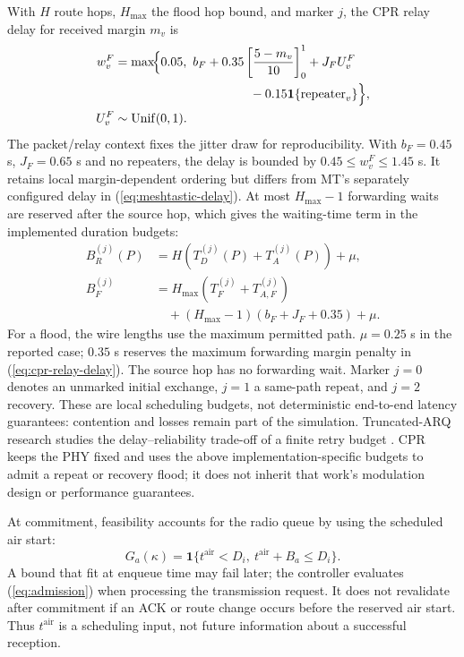 \documentclass[conference,letterpaper,10pt]{IEEEtran}
\begin{document}
With $H$ route hops, $H_{\max}$ the flood hop bound, and marker $j$, the
CPR relay delay for received margin $m_v$ is
\begin{equation}
\begin{aligned}
w_v^{F}&=\max\!\Bigl\{0.05,\ b_F+
  0.35\left[\frac{5-m_v}{10}\right]_0^1+J_F U_v^F\\
 &\hspace{38mm}-0.15\mathbf 1\{\mathrm{repeater}_v\}\Bigr\},\\
U_v^F&\sim\mathrm{Unif}(0,1).
\end{aligned}
\label{eq:cpr-relay-delay}
\end{equation}
The packet/relay context fixes the jitter draw for reproducibility.
With $b_F=0.45$ s, $J_F=0.65$ s and no repeaters, the delay is bounded by
$0.45\leq w_v^F\leq1.45$ s. It retains local margin-dependent ordering
but differs from MT's separately configured delay in
(\ref{eq:meshtastic-delay}). At most $H_{\max}-1$ forwarding waits are
reserved after the source hop, which gives the waiting-time term in the
implemented duration budgets:
\begin{equation}
\begin{aligned}
B_R^{(j)}(P)&=H\left(T_D^{(j)}(P)+T_A^{(j)}(P)\right)+\mu,\\
B_F^{(j)}&=H_{\max}\left(T_F^{(j)}+T_{A,F}^{(j)}\right)\\
 &\quad +(H_{\max}-1)(b_F+J_F+0.35)+\mu.
\end{aligned}
\label{eq:cpr-bounds}
\end{equation}
For a flood, the wire lengths use the maximum permitted path.
$\mu=0.25$ s in the reported case; $0.35$ s reserves the maximum
forwarding margin penalty in (\ref{eq:cpr-relay-delay}).
The source hop has no forwarding wait. Marker $j=0$ denotes an unmarked
initial exchange, $j=1$ a same-path repeat, and $j=2$ recovery.
These are local scheduling budgets, not deterministic end-to-end latency
guarantees: contention and losses remain part of the simulation.
Truncated-ARQ research studies the delay--reliability trade-off of a finite
retry budget \cite{liu2004truncated}. CPR keeps the PHY fixed and uses the
above implementation-specific budgets to admit a repeat or recovery flood;
it does not inherit that work's modulation design or performance guarantees.

At commitment, feasibility accounts for the radio queue by using
the scheduled air start:
\begin{equation}
G_a(\kappa)=\mathbf 1\{t^{\mathrm{air}}<D_i,\ t^{\mathrm{air}}+B_a\leq D_i\}.
\label{eq:admission}
\end{equation}
A bound that fit at enqueue time may fail later; the controller evaluates
(\ref{eq:admission}) when processing the transmission request. It does not
revalidate after commitment if an ACK or route change occurs before the
reserved air start. Thus $t^{\mathrm{air}}$ is a scheduling input, not
future information about a successful reception.
\end{document}
